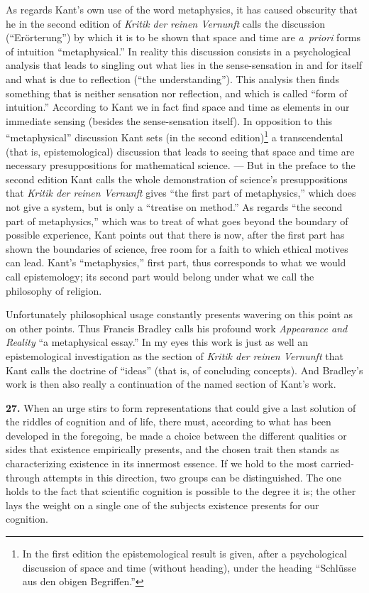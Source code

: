 \documentclass[12pt]{book}
\newcommand{\hnum}[1]{\textbf{#1.}\enspace}
\newcommand{\opage}[1]{\marginnote{\footnotesize\textit{[#1]}}}
\begin{document}
As regards Kant's own use of the word metaphysics, it has caused obscurity that he in the second edition of
\textit{Kritik der reinen Vernunft} calls the discussion (``Erörterung'') by which it is to be shown that
space and time are \textit{a~priori} forms of intuition ``metaphysical.'' In reality this discussion consists
in a psychological analysis that leads to singling out what lies in the sense-sensation in and for itself and
what is due to reflection (``the understanding''). This analysis then finds something that is neither
sensation nor reflection, and which is called ``form of intuition.'' According to Kant we in fact find space
and time as elements in our immediate sensing (besides the sense-sensation itself). In opposition to this
``metaphysical'' discussion Kant sets (in the second edition)\footnote{In the first edition the
epistemological result is given, after a psychological discussion of space and time (without heading), under
the heading ``Schlüsse aus den obigen Begriffen.''} a transcendental (that is, epistemological) discussion
that leads to seeing that space and time are necessary presuppositions for mathematical science. --- But in
the preface to the second edition Kant calls the whole demonstration of science's presuppositions that
\textit{Kritik der reinen Vernunft} gives ``the first part of metaphysics,'' which does not give a system, but
is only a ``treatise on method.'' As regards ``the second part of metaphysics,'' which was to treat of what
goes beyond the boundary of possible experience, Kant points out that there is now, after the first part has
shown the boundaries of science, free room for a faith to which ethical motives can lead. Kant's ``metaphysics,''
first part, thus corresponds to what we would call epistemology; its second part would belong under what we
call the philosophy of religion.

Unfortunately philosophical usage constantly presents wavering on this point as on other points. Thus Francis
Bradley calls \opage{88}his profound work \textit{Appearance and Reality} ``a metaphysical essay.'' In my eyes this
work is just as well an epistemological investigation as the section of \textit{Kritik der reinen Vernunft}
that Kant calls the doctrine of ``ideas'' (that is, of concluding concepts). And Bradley's work is then also
really a continuation of the named section of Kant's work.

\hnum{27} When an urge stirs to form representations that could give a last solution of the riddles of
cognition and of life, there must, according to what has been developed in the foregoing, be made a choice
between the different qualities or sides that existence empirically presents, and the chosen trait then stands
as characterizing existence in its innermost essence. If we hold to the most carried-through attempts in this
direction, two groups can be distinguished. The one holds to the fact that scientific cognition is possible to
the degree it is; the other lays the weight on a single one of the subjects existence presents for our
cognition.
\end{document}
